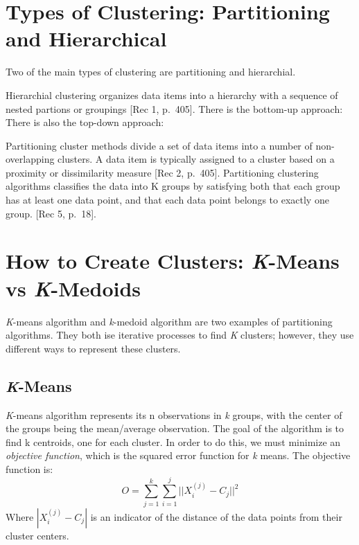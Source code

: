 \documentclass[12pt,twoside]{amherstthesis}
\begin{document}
  \section{Types of Clustering: Partitioning and
  Hierarchical}\label{types-of-clustering-partitioning-and-hierarchical}
  
  Two of the main types of clustering are partitioning and hierarchial.
  
  Hierarchial clustering organizes data items into a hierarchy with a
  sequence of nested partions or groupings {[}Rec 1, p.~405{]}. There is
  the bottom-up approach: There is also the top-down approach:
  
  Partitioning cluster methods divide a set of data items into a number of
  non-overlapping clusters. A data item is typically assigned to a cluster
  based on a proximity or dissimilarity measure {[}Rec 2, p.~405{]}.
  Partitioning clustering algorithms classifies the data into K groups by
  satisfying both that each group has at least one data point, and that
  each data point belongs to exactly one group. {[}Rec 5, p.~18{]}.
  
  \section{\texorpdfstring{How to Create Clusters: \emph{K}-Means vs
  \emph{K}-Medoids}{How to Create Clusters: K-Means vs K-Medoids}}\label{how-to-create-clusters-k-means-vs-k-medoids}
  
  \emph{K}-means algorithm and \emph{k}-medoid algorithm are two examples
  of partitioning algorithms. They both ise iterative processes to find
  \emph{K} clusters; however, they use different ways to represent these
  clusters.
  
  \subsection{\texorpdfstring{\emph{K}-Means}{K-Means}}\label{k-means}
  
  \emph{K}-means algorithm represents its n observations in \emph{k}
  groups, with the center of the groups being the mean/average
  observation. The goal of the algorithm is to find k centroids, one for
  each cluster. In order to do this, we must minimize an \emph{objective
  function}, which is the squared error function for \emph{k} means. The
  objective function is:
  \[O= \sum_{j=1}^k \sum_{i=1}^j ||{{X_i^{(j)}- C_j}}||^2
  \] Where \(|{{X_i^{(j)}- C_j}}|\) is an indicator of the distance of the
  data points from their cluster centers.
  
\end{document}
